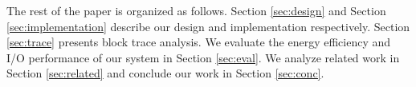 

The rest of the paper is organized as follows. Section
\ref{sec:design} and Section \ref{sec:implementation} describe our
design and implementation respectively. Section \ref{sec:trace}
presents block trace analysis. We evaluate the energy efficiency and
I/O performance of our system in Section \ref{sec:eval}. We analyze
related work in Section \ref{sec:related} and conclude our work in
Section \ref{sec:conc}.

